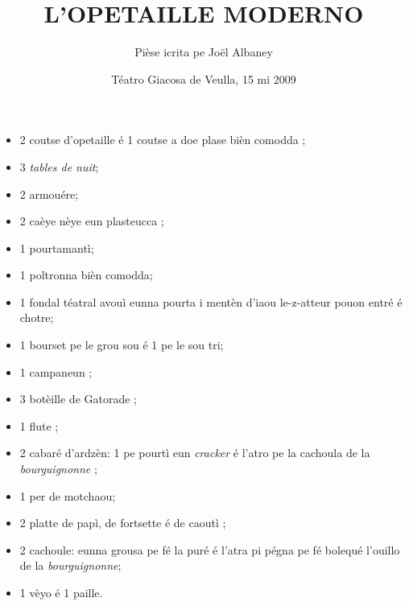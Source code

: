 \title{L’OPETAILLE MODERNO}
\author{Pièse icrita pe Jo\"{e}l Albaney}
\date{Téatro Giacosa de Veulla, 15 mi 2009}

\maketitle

\label{link}





\Scenographie
\begin{itemize}
\item[$\bullet$] 2 coutse d'opetaille é 1 coutse a doe plase bièn comodda  ;
\item[$\bullet$] 3 \textit{tables de nuit};
\item[$\bullet$] 2 armouére;
\item[$\bullet$] 2 caèye nèye eun plasteucca ;
\item[$\bullet$] 1 pourtamantì;
\item[$\bullet$] 1 poltronna bièn comodda;
\item[$\bullet$] 1 fondal téatral avouì eunna pourta i mentèn d'iaou le-z-atteur pouon entré é chotre;
\item[$\bullet$] 1 bourset pe le grou sou é 1 pe le sou tri;
\item[$\bullet$] 1 campaneun \campanellino ;
\item[$\bullet$] 3 botèille de Gatorade ;
\item[$\bullet$] 1 flute ;
\item[$\bullet$] 2 cabaré d’ardzèn: 1 pe pourtì eun \textit{cracker} é l'atro pe la cachoula de la \textit{bourguignonne} ;
\item[$\bullet$] 1 per de motchaou;
\item[$\bullet$] 2 platte de papì, de fortsette é de caoutì \posate ;
\item[$\bullet$] 2 cachoule: eunna grousa pe fé la puré é l'atra pi pégna pe fé bolequé  l'ouillo de la \textit{bourguignonne};
\item[$\bullet$] 1 vèyo é 1 paille.
\end{itemize}

